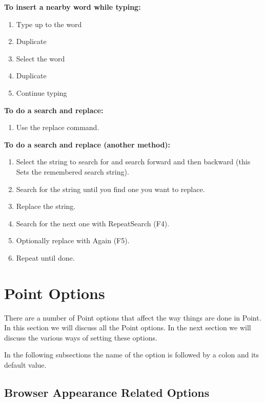 {\bf To insert a nearby word while typing:}
\begin{enumerate}
\item Type up to the word
\item Duplicate
\item Select the word
\item Duplicate
\item Continue typing
\end{enumerate}

{\bf To do a search and replace:}
\begin{enumerate}
\item Use the replace command.
\end{enumerate}

{\bf To do a search and replace (another method):}
\begin{enumerate}
\item Select the string to search for and search forward and then backward
(this Sets the remembered search string).
\item Search for the string until you find one you want to replace.
\item Replace the string.
\item Search for the next one with RepeatSearch (F4).
\item Optionally replace with Again (F5).
\item Repeat until done.
\end{enumerate}




\section{ Point Options} \label{sect:options}

There are a number of Point options that affect the way
things are done in Point.
In this section we will discuss all the Point options.
In the next section we will discuss the various ways
of setting these options.

In the following subsections the name of the option is
followed by a colon and its default value.


\subsection{Browser Appearance Related Options}

